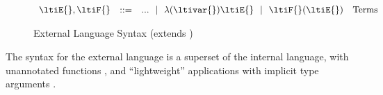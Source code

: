 \begin{figure}
$$
\begin{array}{lrll}
  \ltiE{}, \ltiF{} &::=& ... \alt \ltiufun{\ltivar{}}{\ltiE{}}
                         \alt \ltiapp{\ltiF{}}{\ltiE{}}
                      &\mbox{Terms}
\end{array}
$$
\caption{External Language Syntax
  (extends )
  }
\label{symbolic:figure:external-language-syntax}
\end{figure}

The syntax for the external language
is a superset of the internal language, with unannotated functions 
\ltiufun{\ltivar{}}{\ltiE{}},
and ``lightweight'' applications with implicit type arguments
\ltiapp{\ltiF{}}{\ltiE{}}.

